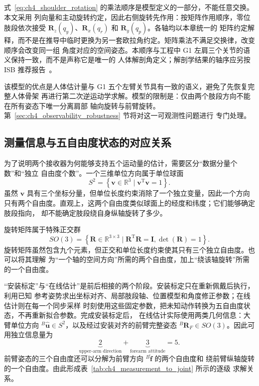 式~\eqref{eq:ch4_shoulder_rotation} 的乘法顺序是模型定义的一部分，不能任意交换。本文采用
列向量和主动旋转约定，因此右侧旋转先作用：按矩阵作用顺序，零位肢段依次接受
$\boldsymbol R_z(q_y)$、$\boldsymbol R_x(q_r)$ 和 $\boldsymbol R_y(q_p)$。各轴均以本章统一的
矩阵约定解释，而不是在推导中临时更换为另一套欧拉角约定。矩阵乘法不满足交换律，改变顺序会改变同一组
角度对应的空间姿态。本顺序与工程中 G1 左肩三个关节的语义保持一致，而不是声称它是唯一的
人体解剖角定义；解剖学结果的轴序应另按 ISB 推荐报告~\cite{wu2005isb}。

该模型的优点是人体估计量与 G1 五个左臂关节具有一致的语义，避免了先恢复完整人体骨架
再进行第二次逆运动学求解。模型的限制是：仅由两个肢段方向不能在所有姿态下唯一分离肩部
轴向旋转与前臂旋转。第~\ref{sec:ch4_observability_robustness} 节将对这一可观测性问题进行
专门处理。

\subsection{测量信息与五自由度状态的对应关系}
\label{subsec:ch4_measurement_dof_correspondence}

为了说明两个接收器为何能够支持五个运动量的估计，需要区分“数据分量个数”和“独立
自由度个数”。一个三维单位方向属于单位球面
\begin{equation}
  S^2=\left\{\boldsymbol v\in\mathbb R^3\mid
  \boldsymbol v^{\mathrm T}\boldsymbol v=1\right\}.
  \label{eq:ch4_unit_sphere_definition}
\end{equation}
虽然 $\boldsymbol v$ 具有三个坐标分量，但单位长度约束消除了一个独立变量，因此一个方向
只有两个自由度。直观上，这两个自由度类似球面上的经度和纬度；它们能够确定肢段指向，
却不能确定肢段绕自身纵轴旋转了多少。

旋转矩阵属于特殊正交群
\begin{equation}
  SO(3)=\left\{\boldsymbol R\in\mathbb R^{3\times3}\mid
  \boldsymbol R^{\mathrm T}\boldsymbol R=\boldsymbol I,
  \det(\boldsymbol R)=1\right\}.
  \label{eq:ch4_so3_definition}
\end{equation}
旋转矩阵虽然包含九个元素，但正交和单位长度约束使其只有三个独立自由度。也可以将其理解
为“一个轴的空间方向”所需的两个自由度，加上“绕该轴旋转”所需的一个自由度。

“安装标定”与“在线估计”是前后相接的两个阶段。安装标定只在重新佩戴后执行，利用已知
参考姿势求出坐标对齐、局部肢段轴、位置模型和角度修正参数；在线估计则在每一个同步采样
时刻使用这些固定参数，把未知动作转换为五自由度状态，不再重新拟合参数。完成安装标定后，
在线估计实际使用两类几何信息：大臂单位方向
${}^{B}\hat{\boldsymbol u}\in S^2$，以及经过安装对齐的前臂完整姿态
${}^{B}\boldsymbol R_F\in SO(3)$。因此可用独立信息量为
\begin{equation}
  \underbrace{2}_{\text{upper-arm direction}}+
  \underbrace{3}_{\text{forearm attitude}}=5.
  \label{eq:ch4_measurement_dof_count}
\end{equation}
前臂姿态的三个自由度还可以分解为前臂方向 ${}^{B}\hat{\boldsymbol f}$ 的两个自由度和
绕前臂纵轴旋转的一个自由度。由此形成表~\ref{tab:ch4_measurement_to_joint} 所示的逐级
求解关系。

